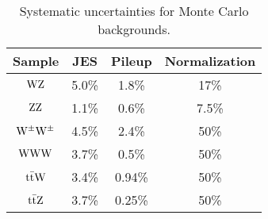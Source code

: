 \begin{table}
    \centering
\begin{tabular}{*4c}
    \toprule
    Sample       &    JES & Pileup & Normalization \\
    \midrule
$\mathrm{W}\mathrm{Z}$             & 5.0\%  & 1.8\%  & 17\%    \\
$\mathrm{Z}\mathrm{Z}$             & 1.1\%  & 0.6\%  & 7.5\% \\
$\mathrm{W}^{\pm}\mathrm{W}^{\pm}$ & 4.5\%  & 2.4\%  & 50\% \\
$\mathrm{W}\mathrm{W}\mathrm{W}$            & 3.7\%  & 0.5\%  & 50\% \\
$\mathrm{t}\bar{\mathrm{t}} \mathrm{W}$       & 3.4\%  & 0.94\% & 50\% \\
$\mathrm{t}\bar{\mathrm{t}} \mathrm{Z}$       & 3.7\%  & 0.25\% & 50\% \\
\bottomrule
\end{tabular}
\caption{Systematic uncertainties for Monte Carlo backgrounds.}
\label{tab:MConlySystematics}
\end{table}

